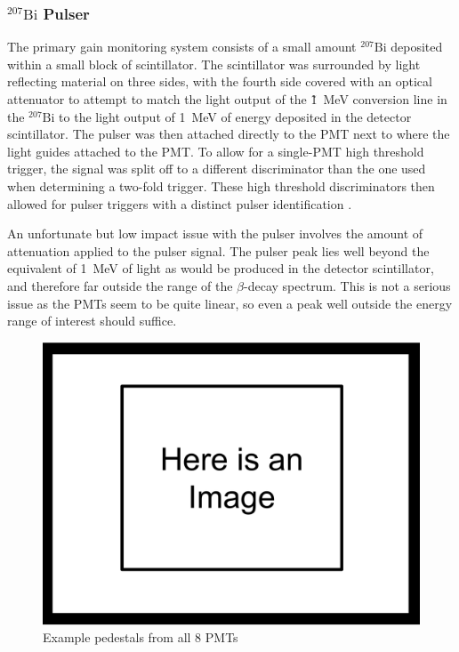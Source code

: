 \subsubsection{$^{207}\mathrm{Bi}$ Pulser}
The primary gain monitoring system consists of a small amount $^{207}\mathrm{Bi}$
deposited within a small block of scintillator. The scintillator was surrounded by
light reflecting material on three sides, with the fourth side covered with an optical
attenuator to attempt to match the light output of the \~1~MeV conversion line in the $^{207}\mathrm{Bi}$
to the light output of 1~MeV of energy deposited in the detector scintillator. The pulser was then
attached directly to the PMT next to where the light guides attached to the PMT.
To allow for a single-PMT high threshold trigger, the signal was split off to a different
discriminator than the one used when determining a two-fold trigger. These high threshold
discriminators then allowed for pulser triggers with a distinct pulser identification \cite{mpmThesis}.

An unfortunate but low impact issue with the pulser involves the amount of attenuation applied to the
pulser signal. The pulser peak lies well beyond the equivalent of 1~MeV of light as would be produced
in the detector scintillator, and therefore far outside the range of the $\beta$-decay spectrum. This
is not a serious issue as the PMTs seem to be quite linear, so even a peak well outside the
energy range of interest should suffice.

\begin{figure}[h] 
\centering
\includegraphics[scale=.25]{3-UCNAAnalysis/ImageHolder.pdf}
\caption{Example pedestals from all 8 PMTs}
\label{fig:biPulser}
\end{figure}

